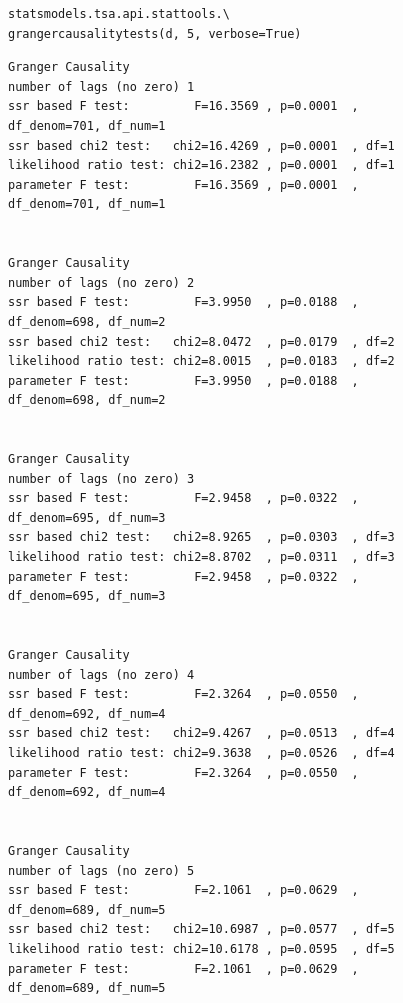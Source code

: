 \begin{figure}
  \begin{minipage}{\textwidth}
    \begin{lstlisting}[caption=浦发银行 (600000) 格兰杰因果关系检验, label=f_test:8]
statsmodels.tsa.api.stattools.\
grangercausalitytests(d, 5, verbose=True)
    \end{lstlisting}
  \end{minipage}
\end{figure}

\begin{figure}
  \begin{minipage}{\textwidth}
    \begin{lstlisting}[caption=浦发银行 (600000) 检验结果, label=f_test:9]
Granger Causality
number of lags (no zero) 1
ssr based F test:         F=16.3569 , p=0.0001  , df_denom=701, df_num=1
ssr based chi2 test:   chi2=16.4269 , p=0.0001  , df=1
likelihood ratio test: chi2=16.2382 , p=0.0001  , df=1
parameter F test:         F=16.3569 , p=0.0001  , df_denom=701, df_num=1


Granger Causality
number of lags (no zero) 2
ssr based F test:         F=3.9950  , p=0.0188  , df_denom=698, df_num=2
ssr based chi2 test:   chi2=8.0472  , p=0.0179  , df=2
likelihood ratio test: chi2=8.0015  , p=0.0183  , df=2
parameter F test:         F=3.9950  , p=0.0188  , df_denom=698, df_num=2


Granger Causality
number of lags (no zero) 3
ssr based F test:         F=2.9458  , p=0.0322  , df_denom=695, df_num=3
ssr based chi2 test:   chi2=8.9265  , p=0.0303  , df=3
likelihood ratio test: chi2=8.8702  , p=0.0311  , df=3
parameter F test:         F=2.9458  , p=0.0322  , df_denom=695, df_num=3


Granger Causality
number of lags (no zero) 4
ssr based F test:         F=2.3264  , p=0.0550  , df_denom=692, df_num=4
ssr based chi2 test:   chi2=9.4267  , p=0.0513  , df=4
likelihood ratio test: chi2=9.3638  , p=0.0526  , df=4
parameter F test:         F=2.3264  , p=0.0550  , df_denom=692, df_num=4


Granger Causality
number of lags (no zero) 5
ssr based F test:         F=2.1061  , p=0.0629  , df_denom=689, df_num=5
ssr based chi2 test:   chi2=10.6987 , p=0.0577  , df=5
likelihood ratio test: chi2=10.6178 , p=0.0595  , df=5
parameter F test:         F=2.1061  , p=0.0629  , df_denom=689, df_num=5
    \end{lstlisting}
  \end{minipage}
\end{figure}

